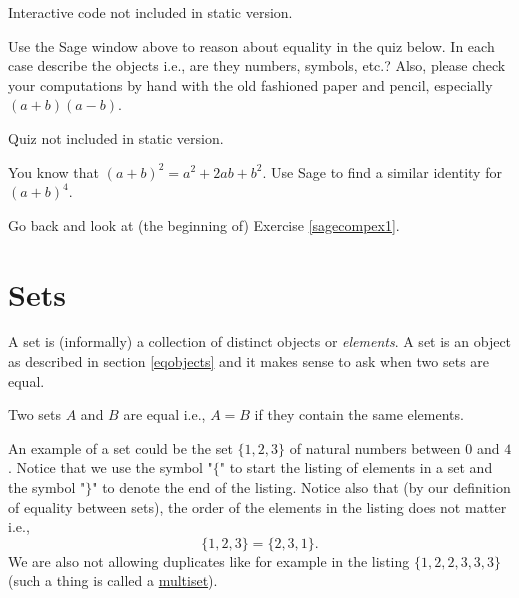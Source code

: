 \begin{exercise}\label{sagecompex1}

  \begin{sage} Interactive code not included in static version.\end{sage}

  Use the Sage window above to reason
  about equality in the quiz below. In each case describe the objects i.e.,
  are they numbers, symbols, etc.? Also, please check your computations
  by hand with the old fashioned paper and pencil, especially $(a+b)(a-b)$.

  \begin{quiz} Quiz not included in static version.\end{quiz}
\end{exercise}

\begin{exercise}
  You know that $(a+ b)^2 = a^2 + 2 a b + b^2$. Use Sage to find a similar identity
  for $(a + b)^4$.

  \begin{hint}
    Go back and look at (the beginning of) Exercise \ref{sagecompex1}.
  \end{hint}
\end{exercise}

\section{Sets}

A set is (informally) a collection of distinct objects or \emph{elements}. A set
is an object as described in section \ref{eqobjects} and it makes sense to
ask when two sets are equal.

\begin{tcolorbox}\begin{definition}
    Two sets $A$ and $B$ are equal i.e., $A = B$ if they contain the same elements.
  \end{definition}\end{tcolorbox}

An example of a set could be
the set $\{1,2,3\}$ of natural numbers between $0$ and $4$. Notice that we use the symbol
"$\{$" to start the listing of elements in a set and the symbol "$\}$" to denote the end of the listing.
Notice also that (by our definition of equality between sets), the order of the elements in the listing does not matter i.e.,
$$
  \{1, 2, 3\} = \{2, 3, 1\}.
$$
We are also not allowing duplicates like for
example in the listing $\{1, 2, 2, 3, 3, 3\}$ (such a thing is called a \href{https://en.m.wikipedia.org/wiki/Multiset}{multiset}).


